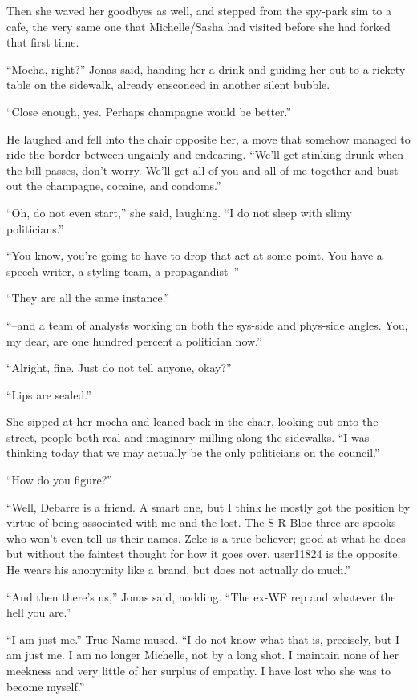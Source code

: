 Then she waved her goodbyes as well, and stepped from the spy-park sim to a cafe, the very same one that Michelle/Sasha had visited before she had forked that first time.

``Mocha, right?'' Jonas said, handing her a drink and guiding her out to a rickety table on the sidewalk, already ensconced in another silent bubble.

``Close enough, yes. Perhaps champagne would be better.''

He laughed and fell into the chair opposite her, a move that somehow managed to ride the border between ungainly and endearing. ``We'll get stinking drunk when the bill passes, don't worry. We'll get all of you and all of me together and bust out the champagne, cocaine, and condoms.''

``Oh, do not even start,'' she said, laughing. ``I do not sleep with slimy politicians.''

``You know, you're going to have to drop that act at some point. You have a speech writer, a styling team, a propagandist--''

``They are all the same instance.''

``--and a team of analysts working on both the sys-side and phys-side angles. You, my dear, are one hundred percent a politician now.''

``Alright, fine. Just do not tell anyone, okay?''

``Lips are sealed.''

She sipped at her mocha and leaned back in the chair, looking out onto the street, people both real and imaginary milling along the sidewalks. ``I was thinking today that we may actually be the only politicians on the council.''

``How do you figure?''

``Well, Debarre is a friend. A smart one, but I think he mostly got the position by virtue of being associated with me and the lost. The S-R Bloc three are spooks who won't even tell us their names. Zeke is a true-believer; good at what he does but without the faintest thought for how it goes over. user11824 is the opposite. He wears his anonymity like a brand, but does not actually do much.''

``And then there's us,'' Jonas said, nodding. ``The ex-WF rep and whatever the hell you are.''

``I am just me.'' True Name mused. ``I do not know what that is, precisely, but I am just me. I am no longer Michelle, not by a long shot. I maintain none of her meekness and very little of her surplus of empathy. I have lost who she was to become myself.''

